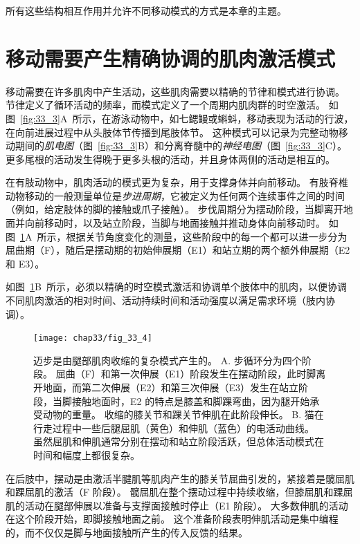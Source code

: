 所有这些结构相互作用并允许不同移动模式的方式是本章的主题。



\section{移动需要产生精确协调的肌肉激活模式}

移动需要在许多肌肉中产生活动，这些肌肉需要以精确的节律和模式进行协调。
节律定义了循环活动的频率，而模式定义了一个周期内肌肉群的时空激活。
如图~\ref{fig:33_3}A~所示，在游泳动物中，如七鳃鳗或蝌蚪，移动表现为活动的行波，在向前进展过程中从头肢体节传播到尾肢体节。
这种模式可以记录为完整动物移动期间的\textit{肌电图}（图~\ref{fig:33_3}B）和分离脊髓中的\textit{神经电图}（图~\ref{fig:33_3}C）。
更多尾根的活动发生得晚于更多头根的活动，并且身体两侧的活动是相互的。


在有肢动物中，肌肉活动的模式更为复杂，用于支撑身体并向前移动。
有肢脊椎动物移动的一般测量单位是\textit{步进周期}，它被定义为任何两个连续事件之间的时间（例如，给定肢体的脚的接触或爪子接触）。
步伐周期分为摆动阶段，当脚离开地面并向前移动时，以及站立阶段，当脚与地面接触并推动身体向前移动时。
如图~\ref{fig:33_4}A~所示，根据关节角度变化的测量，这些阶段中的每一个都可以进一步分为屈曲期（F），随后是摆动期的初始伸展期（E1）和站立期的两个额外伸展期（E2 和 E3）。


如图~\ref{fig:33_4}B~所示，必须以精确的时空模式激活和协调单个肢体中的肌肉，以便协调不同肌肉激活的相对时间、活动持续时间和活动强度以满足需求环境（肢内协调）。


\begin{figure}[htbp]
	\centering
	\texttt{[image: chap33/fig\_33\_4]}
	\caption{迈步是由腿部肌肉收缩的复杂模式产生的。
	A. 步循环分为四个阶段。
	屈曲（F）和第一次伸展（E1）阶段发生在摆动阶段，此时脚离开地面，而第二次伸展（E2）和第三次伸展（E3）发生在站立阶段，当脚接触地面时，E2 的特点是膝盖和脚踝弯曲，因为腿开始承受动物的重量。
	收缩的膝关节和踝关节伸肌在此阶段伸长\cite{engberg1969electromyographic}。
	B. 猫在行走过程中一些后腿屈肌（黄色）和伸肌（蓝色）的电活动曲线。
	虽然屈肌和伸肌通常分别在摆动和站立阶段活跃，但总体活动模式在时间和幅度上都很复杂。}
	\label{fig:33_4}
\end{figure}


在后肢中，摆动是由激活半腱肌等肌肉产生的膝关节屈曲引发的，紧接着是髋屈肌和踝屈肌的激活（F 阶段）。
髋屈肌在整个摆动过程中持续收缩，但膝屈肌和踝屈肌的活动在腿部伸展以准备与支撑面接触时停止（E1 阶段）。
大多数伸肌的活动在这个阶段开始，即脚接触地面之前。
这个准备阶段表明伸肌活动是集中编程的，而不仅仅是脚与地面接触所产生的传入反馈的结果。


